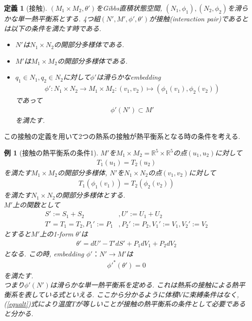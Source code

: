 \documentclass[a4paper,12pt]{ltjsarticle}
\theoremstyle{break}
\newtheorem{defn}[thm]{定義}
\newtheorem{eg}[thm]{例}
\newcommand{\mbr}{\mathbb{R}}
\newcommand{\mt}{\mapsto}
\newcommand{\ti}{\times}
\numberwithin{equation}{section}
\begin{document}
\begin{defn}[接触]
  $(M_1 \ti M_2,\theta')$をGibbs直積状態空間, $(N_1,\phi_1), (N_2,\phi_2)$を滑らかな単一熱平衡系とする. 
  4つ組$(N',M',\phi',\theta')$が接触(interaction pair)であるとは以下の条件を満たす時である. 
  \begin{itemize}
    \item $N'$は$N_1 \ti N_2$の開部分多様体である.
    \item $M'$は$M_1 \ti M_2$の開部分多様体である.
    \item $q_1 \in N_1, q_2 \in N_2$に対して$\phi'$は滑らかなembedding 
    \begin{align*}
      \phi': N_1 \ti N_2 \to M_1 \ti M_2: (v_1,v_2) \mt (\phi_1(v_1), \phi_2(v_2))
    \end{align*}
    であって
    \begin{align*}
      \phi'(N') \subset M'
    \end{align*}
    を満たす. 
  \end{itemize}
\end{defn}

この接触の定義を用いて2つの熱系の接触が熱平衡系となる時の条件を考える. 

\begin{eg}[接触の熱平衡系の条件1]
  $M'$を$M_1 \ti M_2 = \mbr^5 \ti \mbr^5$の点$(u_1,u_2)$に対して
  \begin{align*}
    T_1(u_1)=T_2(u_2)
  \end{align*}
  を満たす$M_1 \ti M_2$の開部分多様体, 
  $N'$を$N_1 \ti N_2$の点$(v_1,v_2)$に対して
  \begin{align}
    \label{equalt}
    T_1(\phi_1(v_1))
    = T_2(\phi_2(v_2))
  \end{align}
  を満たす$N_1 \ti N_2$の開部分多様体とする. \\
  $M'$上の関数として
  \begin{align*}
    S':=S_1+S_2 &, U':=U_1+U_2 \\
    T'=T_1=T_2, P_1':=P_1 &, P_2':=P_2, V_1':=V_1, V_2':=V_2
  \end{align*}
  とすると$M'$上の1-form $\theta'$は
  \begin{align*}
    \theta'
    =dU' - T'dS' + P_1dV_1 + P_2dV_2
  \end{align*}
  となる. 
  この時, embedding $\phi'：N' \to M'$は
  \begin{align*}
    \phi'^*(\theta')
    = 0
  \end{align*}
  を満たす. \\
  つまり$\phi'(N')$は滑らかな単一熱平衡系を定める. 
  これは熱系の接触による熱平衡系を表している式といえる.
  ここから分かるように体積$V$に束縛条件はなく, 
  (\ref{equalt})式により温度$T$が等しいことが接触の熱平衡系の条件として必要であると分かる.  
\end{eg}  
\end{document}
